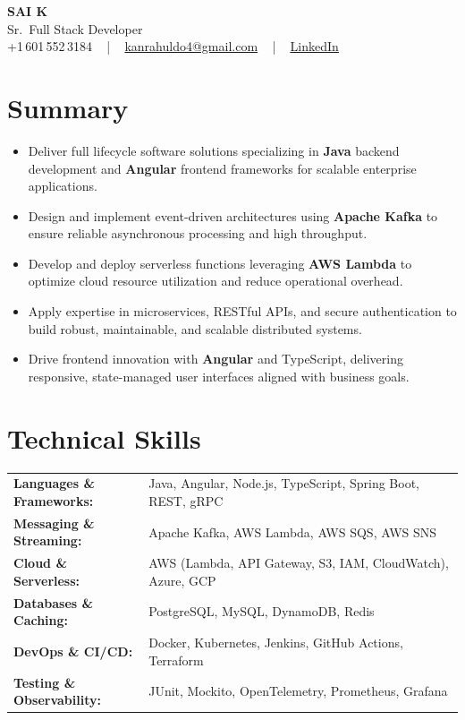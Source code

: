 \documentclass[letterpaper,11pt]{article}
\newcommand{\resumeItem}[1]{
  \item\footnotesize{
    {#1 \vspace{-2pt}}
  }
}
\newcommand{\resumeItemListStart}{\begin{itemize}[leftmargin=*]}
\newcommand{\resumeItemListEnd}{\end{itemize}\vspace{-5pt}}
\begin{document}
\begin{center}
    {\fontsize{14pt}{12pt}\selectfont \textbf{\MakeUppercase{Sai K}}}\\ \vspace{2pt}
    \fontsize{10pt}{12pt}\selectfont Sr.\ Full Stack Developer\\ \vspace{2pt}
    \fontsize{10pt}{12pt}\selectfont +1\,601\,552\,3184 ~ | ~
    \href{mailto:kanrahuldo4@gmail.com}{kanrahuldo4@gmail.com} ~ | ~
    \href{https://www.linkedin.com/in/srrrk/}{\color{blue}\underline{LinkedIn}}
    \vspace{-10pt}
\end{center}

\section{Summary}
\fontsize{9pt}{10pt}\selectfont
\resumeItemListStart
  \resumeItem{Deliver full lifecycle software solutions specializing in \textbf{Java} backend development and \textbf{Angular} frontend frameworks for scalable enterprise applications.}
  \resumeItem{Design and implement event-driven architectures using \textbf{Apache Kafka} to ensure reliable asynchronous processing and high throughput.}
  \resumeItem{Develop and deploy serverless functions leveraging \textbf{AWS Lambda} to optimize cloud resource utilization and reduce operational overhead.}
  \resumeItem{Apply expertise in microservices, RESTful APIs, and secure authentication to build robust, maintainable, and scalable distributed systems.}
  \resumeItem{Drive frontend innovation with \textbf{Angular} and TypeScript, delivering responsive, state-managed user interfaces aligned with business goals.}
\resumeItemListEnd
\vspace{-6pt}

\section{Technical Skills}
\vspace{-14pt}
\begin{table}[h]
\fontsize{9pt}{10pt}\selectfont
\begin{tabular}{p{0.3\linewidth} p{0.7\linewidth}}
\textbf{Languages \& Frameworks:} & Java, Angular, Node.js, TypeScript, Spring Boot, REST, gRPC \\
\textbf{Messaging \& Streaming:} & Apache Kafka, AWS Lambda, AWS SQS, AWS SNS \\
\textbf{Cloud \& Serverless:} & AWS (Lambda, API Gateway, S3, IAM, CloudWatch), Azure, GCP \\
\textbf{Databases \& Caching:} & PostgreSQL, MySQL, DynamoDB, Redis \\
\textbf{DevOps \& CI/CD:} & Docker, Kubernetes, Jenkins, GitHub Actions, Terraform \\
\textbf{Testing \& Observability:} & JUnit, Mockito, OpenTelemetry, Prometheus, Grafana \\
\end{tabular}
\end{table}
\vspace{-15pt}
\end{document}
